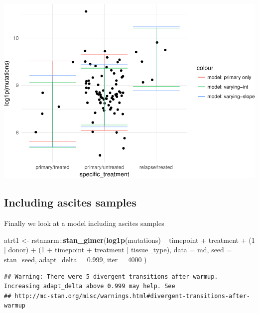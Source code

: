 \documentclass[]{article}
\newenvironment{Shaded}{\begin{snugshade}}{\end{snugshade}}
\newcommand{\KeywordTok}[1]{\textcolor[rgb]{0.13,0.29,0.53}{\textbf{{#1}}}}
\newcommand{\DataTypeTok}[1]{\textcolor[rgb]{0.13,0.29,0.53}{{#1}}}
\newcommand{\DecValTok}[1]{\textcolor[rgb]{0.00,0.00,0.81}{{#1}}}
\newcommand{\FloatTok}[1]{\textcolor[rgb]{0.00,0.00,0.81}{{#1}}}
\newcommand{\StringTok}[1]{\textcolor[rgb]{0.31,0.60,0.02}{{#1}}}
\newcommand{\NormalTok}[1]{{#1}}
\begin{document}
\includegraphics{Hierarchical_model_mutations_and_peptides_files/figure-latex/allsolid-strt3-ppred-1.pdf}

\subsection{Including ascites samples}\label{including-ascites-samples}

Finally we look at a model including ascites samples

\begin{Shaded}
\begin{Highlighting}[]
\NormalTok{atrt1 <-}\StringTok{ }\NormalTok{rstanarm::}\KeywordTok{stan_glmer}\NormalTok{(}\KeywordTok{log1p}\NormalTok{(mutations) ~}\StringTok{ }
\StringTok{                                }\NormalTok{timepoint +}\StringTok{ }\NormalTok{treatment +}\StringTok{ }\NormalTok{(}\DecValTok{1} \NormalTok{|}\StringTok{ }\NormalTok{donor) +}
\StringTok{                                }\NormalTok{(}\DecValTok{1} \NormalTok{+}\StringTok{ }\NormalTok{timepoint +}\StringTok{ }\NormalTok{treatment |}\StringTok{ }\NormalTok{tissue_type),}
                              \DataTypeTok{data =} \NormalTok{md,}
                              \DataTypeTok{seed =} \NormalTok{stan_seed,}
                              \DataTypeTok{adapt_delta =} \FloatTok{0.999}\NormalTok{,}
                              \DataTypeTok{iter =} \DecValTok{4000}
                              \NormalTok{)}
\end{Highlighting}
\end{Shaded}

\begin{verbatim}
## Warning: There were 5 divergent transitions after warmup. Increasing adapt_delta above 0.999 may help. See
## http://mc-stan.org/misc/warnings.html#divergent-transitions-after-warmup
\end{verbatim}
\end{document}
